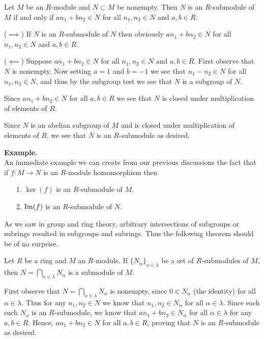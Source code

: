\begin{thm} Let $M$ be an $R$-module and $N
\subset M$ be nonempty. Then $N$ is an $R$-submodule of $M$ if and
only if $an_1 + bn_2 \in N$ for all $n_1, n_2 \in N$ and $a, b \in
R$. 
\end{thm}

\begin{prf}
    ($\implies$) If $N$ is an $R$-submodule of $N$ then obviously $an_1 + bn_2
    \in N$ for all $n_1, n_2 \in N$ and $a, b \in R$. 

    ($\impliedby$) Suppose $an_1 + bn_2 \in N$ for all $n_1, n_2
    \in N$ and $a, b \in R$. 
    First observe that $N$ is nonempty. Now
    setting $a = 1$ and $b = -1$ we
    see that $n_1 - n_2 \in N$ for all $n_1, n_2 \in N$, and thus
    by the subgroup test we see that $N$ is a subgroup of $N$. 

    Since $an_1 + bn_2 \in N$ for all $a, b \in R$ we see that $N$
    is closed under multiplication of elements of $R$. 

    Since $N$ is an abelian subgroup of $M$ and is closed under
    multiplication of elements of $R$, we see that $N$ is an
    $R$-submodule as desired. 
\end{prf}

\noindent \textbf{Example.}\\
An immediate example we can create from our previous discussions
the fact that if $f: M \to N$ is an $R$-module homomorphism then 
\begin{itemize}
    \item[1.] $\ker(f)$ is an $R$-submodule of $M$.
    \item[2.] $\mbox{Im}(f)$ is an $R$-submodule of $N$. 
\end{itemize}

As we saw in group and ring theory, arbitrary intersections of
subgroups or subrings resulted in subgroups and subrings. Thus the
following theorem should be of no surprise.

\begin{thm}
    Let $R$ be a ring and $M$ an $R$-module. If $\{N_\alpha\}_{\alpha \in \lambda}$ be a
    set of $R$-submodules of $M$, then $N = \bigcap_{\alpha \in
    \lambda}N_{\alpha}$ is a submodule of $M$. 
\end{thm}

\begin{prf}
    First observe that $N = \bigcap_{\alpha \in
    \lambda}N_{\alpha}$ is nonempty, since $0 \in N_\alpha$ (the
    identity) for all $\alpha \in \lambda$. Thus for any $n_1, n_2
    \in N$ we know that $n_1, n_2 \in N_\alpha$ for all $\alpha
    \in \lambda$. Since each such $N_\alpha$ is an $R$-submodule,
    we know that $an_1 + bn_2 \in N_\alpha$ for all $\alpha \in 
    \lambda$ for any $a, b \in R$. Hence, $an_1 + bn_2 \in N$ for
    all $a, b \in R$, proving that $N$ is an $R$-submodule as
    desired. 
\end{prf}

